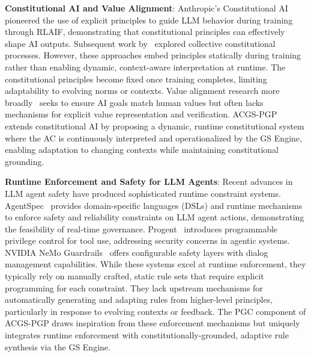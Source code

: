 \documentclass[sigconf,review,anonymous=false]{acmart} %
\begin{document}
\textbf{Constitutional AI and Value Alignment}: Anthropic's Constitutional AI~\cite{BaiConstitutionalAI22} pioneered the use of explicit principles to guide LLM behavior during training through RLAIF, demonstrating that constitutional principles can effectively shape AI outputs. Subsequent work by~\cite{AnthropicCollectiveConstitutionalAI23} explored collective constitutional processes. However, these approaches embed principles statically during training rather than enabling dynamic, context-aware interpretation at runtime. The constitutional principles become fixed once training completes, limiting adaptability to evolving norms or contexts. Value alignment research more broadly~\cite{KrishnamurthyValueAlignment23, ChristianoDeepRLHumanPreferences17} seeks to ensure AI goals match human values but often lacks mechanisms for explicit value representation and verification. ACGS-PGP extends constitutional AI by proposing a dynamic, runtime constitutional system where the AC is continuously interpreted and operationalized by the GS Engine, enabling adaptation to changing contexts while maintaining constitutional grounding.

\textbf{Runtime Enforcement and Safety for LLM Agents}: Recent advances in LLM agent safety have produced sophisticated runtime constraint systems. AgentSpec~\cite{WangAgentSpec25} provides domain-specific languages (DSLs) and runtime mechanisms to enforce safety and reliability constraints on LLM agent actions, demonstrating the feasibility of real-time governance. Progent~\cite{LianProgent25} introduces programmable privilege control for tool use, addressing security concerns in agentic systems. NVIDIA NeMo Guardrails~\cite{NVIDIANeMoGuardrails} offers configurable safety layers with dialog management capabilities. While these systems excel at runtime enforcement, they typically rely on manually crafted, static rule sets that require explicit programming for each constraint. They lack upstream mechanisms for automatically generating and adapting rules from higher-level principles, particularly in response to evolving contexts or feedback. The PGC component of ACGS-PGP draws inspiration from these enforcement mechanisms but uniquely integrates runtime enforcement with constitutionally-grounded, adaptive rule synthesis via the GS Engine.
\end{document}
